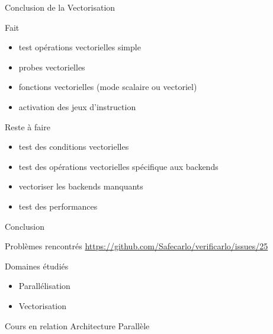 \documentclass{beamer}
\begin{document}
\begin{frame}{Conclusion de la Vectorisation}

  \begin{block}{Fait}
    \begin{itemize}
    \item test opérations vectorielles simple
    \item probes vectorielles
    \item fonctions vectorielles (mode scalaire ou vectoriel)
    \item activation des jeux d'instruction
    \end{itemize}
  \end{block}

  \begin{alertblock}{Reste à faire}
    \begin{itemize}
    \item test des conditions vectorielles
    \item test des opérations vectorielles spécifique aux backends
    \item vectoriser les backends manquants
    \item test des performances
    \end{itemize}
  \end{alertblock}

\end{frame}

\begin{frame}{Conclusion}

  \begin{block}{Problèmes rencontrés}
    \url{https://github.com/Safecarlo/verificarlo/issues/25}
  \end{block}

  \begin{block}{Domaines étudiés}
    \begin{itemize}
    \item Parallélisation
    \item Vectorisation
    \end{itemize}
  \end{block}
  
  \begin{block}{Cours en relation}
    Architecture Parallèle
  \end{block}

\end{frame}
\end{document}
